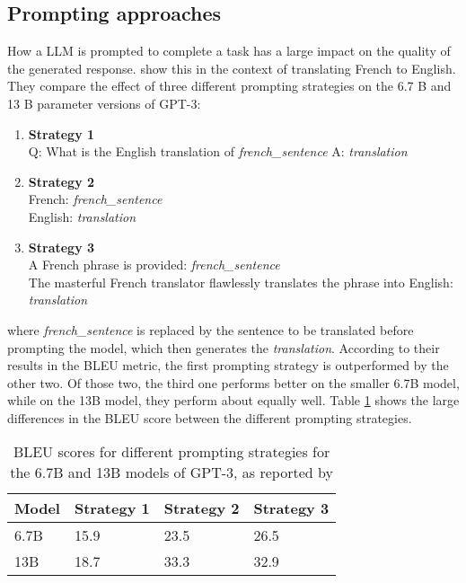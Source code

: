 \subsection{Prompting approaches}\label{sec:prompting-approaches}
How a LLM is prompted to complete a task has a large impact on the quality of the generated response.
\cite{reynolds:2021:Prompt} show this in the context of translating French to English.
They compare the effect of three different prompting strategies on the 6.7 B and 13 B parameter versions of GPT-3:
\begin{enumerate}
    \item \textbf{Strategy 1}\\Q: What is the English translation of \textit{french\_sentence} A: \textit{translation}
    \item \textbf{Strategy 2}\\French: \textit{french\_sentence}\\English: \textit{translation}
    \item \textbf{Strategy 3}\\A French phrase is provided: \textit{french\_sentence}\\
    The masterful French translator flawlessly translates the phrase
into English: \textit{translation}
\end{enumerate}
where \textit{french\_sentence} is replaced by the sentence to be translated before prompting the model, which then generates the \textit{translation}.
According to their results in the BLEU metric, the first prompting strategy is outperformed by the other two.
Of those two, the third one performs better on the smaller 6.7B model, while on the 13B model, they perform  about equally well.
Table \ref{tab:fr-en-prompting} shows the large differences in the BLEU score between the different prompting strategies.
\begin{table}[tb]
\centering
\begin{tabularx}{\textwidth}{lXXX}
\hline
\textbf{Model} & \textbf{Strategy 1} & \textbf{Strategy 2} & \textbf{Strategy 3} \\
\hline
6.7B & 15.9 & 23.5 & 26.5 \\
13B & 18.7 & 33.3 & 32.9 \\
\hline
\end{tabularx}
\caption{BLEU scores for different prompting strategies for the 6.7B and 13B models of GPT-3, as reported by \cite{reynolds:2021:Prompt}}\label{tab:fr-en-prompting}
\end{table}
\\

